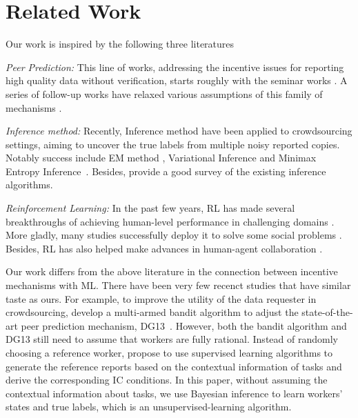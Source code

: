 \section{Related Work}
Our work is inspired by the following three literatures 

\emph{Peer Prediction:} This line of works, addressing the incentive issues for reporting high quality data without verification, starts roughly with the seminar works \cite{prelec2004bayesian,gneiting2007strictly}. A series of follow-up works have relaxed various assumptions of this family of mechanisms \cite{jurca2009mechanisms,witkowski2012peer,radanovic2013robust,dasgupta2013crowdsourced}. 

\emph{Inference method:} Recently, Inference method have been applied to crowdsourcing settings, aiming to uncover the true labels from multiple noisy reported copies. Notably success include EM method \cite{dawid1979maximum,raykar2010learning,zhang2014spectral}, Variational Inference \cite{liu2012variational,chen2015statistical} and Minimax Entropy Inference~\cite{zhou2012learning,zhou2014aggregating}. Besides, \citet{zheng2017truth} provide a good survey of the existing inference algorithms.

\emph{Reinforcement Learning:} In the past few years, %
RL has made several breakthroughs of achieving human-level performance in challenging domains \citep{Mnih15,Hasselt2016DeepRL,Silver17}. More gladly, many studies successfully deploy it to solve some social problems \citep{Yu2013EmotionalMR,Leibo2017}. Besides, RL has also helped make advances in human-agent collaboration \citep{Sadhu2016ArgusSH,Wang2017}.


Our work differs from the above literature in the connection between incentive mechanisms with ML. There have been very few recenct studies that have similar taste as ours.
For example, to improve the utility of the data requester in crowdsourcing, \citet{liu2017sequential} develop a multi-armed bandit algorithm to adjust the state-of-the-art peer prediction mechanism, DG13~\cite{dasgupta2013crowdsourced}.
However, both the bandit algorithm and DG13 still need to assume that workers are fully rational.
Instead of randomly choosing a reference worker, \citet{liu2017machine} propose to use supervised learning algorithms to generate the reference reports based on the contextual information of tasks and derive the corresponding IC conditions.
In this paper, without assuming the contextual information about tasks, we use Bayesian inference to learn workers' states and true labels, which is an unsupervised-learning algorithm.

